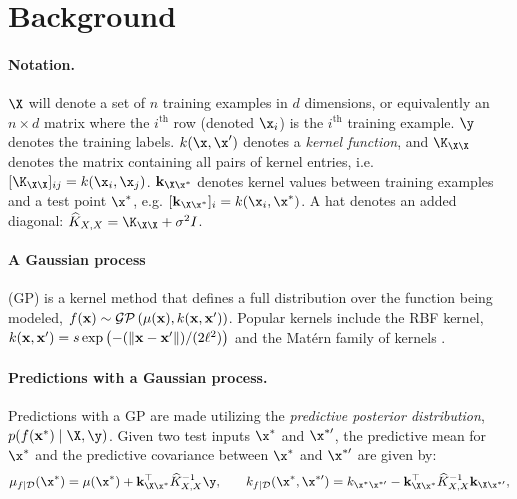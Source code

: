 \section{Background}

\paragraph{Notation.}
$\X$ will denote a set of $n$ training examples in $d$ dimensions, or equivalently an $n \times d$ matrix where the $i^{\text{th}}$ row (denoted $\x_{i}$) is the $i^\text{th}$ training example.
$\y$ denotes the training labels.
$k(\x, \x')$ denotes a \emph{kernel function}, and $\K_{\X\X}$ denotes the matrix containing all pairs of kernel entries, i.e. $[\K_{\X\X}]_{ij} = k(\x_{i}, \x_{j})$.
$\bk_{\X\x^{*}}$ denotes kernel values between training examples and a test point $\x^{*}$, e.g. $[\bk_{\X\x^{*}}]_{i} = k(\x_{i}, \x^{*})$.
A hat denotes an added diagonal: $\trainK = \K_{\X\X} + \sigma^{2}I$.

\paragraph{A Gaussian process} (GP) is a kernel method that defines a full distribution over the function being modeled, $f(\mathbf{x}) \sim \mathcal{GP} \left( \mu(\mathbf{x}), k(\mathbf{x},\mathbf{x}^{\prime}) \right)$.
Popular kernels include the RBF kernel, $k(\mathbf{x}, \mathbf{x}^{\prime}) = s\exp\left(-(\Vert \mathbf{x} - \mathbf{x}^{\prime} \Vert)/(2\ell^{2})\right)$ and the Mat\'ern family of kernels \cite{rasmussen2006gaussian}.

\paragraph{Predictions with a Gaussian process.}
Predictions with a GP are made utilizing the \emph{predictive posterior distribution}, $p(f(\bx^{*})\mid\X,\y)$. Given two test inputs $\x^{*}$ and $\x^{*\prime}$, the predictive mean for $\x^{*}$ and the predictive covariance between $\x^{*}$ and $\x^{*\prime}$ are given by:
%
\begin{align}
  \mu_{f \mid \dset}(\x^*) = \mu(\x^*) + \bk_{\X \x^*}^\top \trainK^{-1} \y,
  &&&&
  k_{f\mid\dset}(\x^*, \x^{*\prime}) = k_{\x^{*} \x^{*\prime}} - \bk_{\X \x^{*}}^\top \trainK^{-1} \bk_{\X \x^{*\prime}},
    \label{eq:pred_mean_covar}
\end{align}
%
